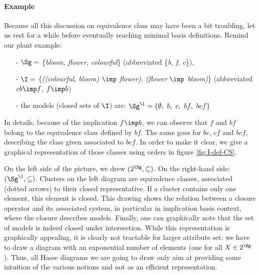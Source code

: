 \paragraph{Example} Because all this discussion on equivalence class may have
been a bit troubling, let us rest for a while before eventually reaching 
minimal basis definitions. Remind our plant example:
\begin{itemize}
	\item[-] $\Sg = $ \{\textit{bloom, flower, colourful}\} (abbreviated 
	\{\textit{b, f, c}\}),
	\item[-] $\I = $ \{\textit{((colourful, bloom) $\imp$ flower), (flower 
	$\imp$ bloom)}\} (abbreviated $cb \imp f$, $f \imp b$)
	\item[-] the models (closed sets of $\I$) are: $\Sg^{\I} = \{ \emptyset, \ 
	b, \ c, \ bf, \ bcf \}$
\end{itemize}
\noindent In details, because of the implication $f \imp b$, we can observe 
that $f$ and $bf$ belong to the equivalence class defined by $bf$. The same
goes for $bc$, $cf$ and $bcf$, describing the class given associated to $bcf$.
In order to make it clear, we give a graphical representation of those classes
using orders in figure \ref{fig:I-def-CS}.

\begin{figure}[ht]
	
\end{figure}

\vspace{1.2em}

On the left side of the picture, we drew $(2^{\Sg}, \subseteq)$. On the
right-hand side: $(\Sg^{\I}, \subseteq)$. Clusters on the left diagram are
 equivalence classes, associated (dotted arrows) to their
closed representative. If a cluster contains only one element, this element is 
closed. This drawing shows the relation between a closure operator and its 
associated system, in particular in implication basis context, where the 
closure describes models. Finally, one can graphically note that the set of 
models is indeed closed under intersection. While this representation is 
graphically appealing, it is clearly not tractable for larger attribute set: we 
have to draw a diagram with an exponential number of elements (one for all $X 
\in 2^{\Sg}$). Thus, all Hasse diagrams we are going to draw only aim at 
providing some intuition of the various notions and not as an efficient 
representation.

\vspace{1.2em}

